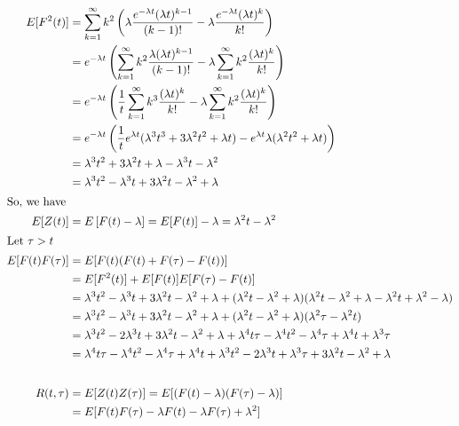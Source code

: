 \begin{enumerate}
\begin{align*}
      E[F^2(t)] & = \sum_{k=1}^{\infty} k^2 \left( \lambda \df{e^{-\lambda t} (\lambda t)^{k-1}}{(k-1)!}
                -\lambda \df{e^{-\lambda t} (\lambda t)^k}{k!} \right) \\
           & = e^{-\lambda t} \left( \sum_{k=1}^{\infty} k^2 \df{\lambda (\lambda t)^{k-1}}{(k-1)!}
             - \lambda \sum_{k=1}^{\infty} k^2\df{(\lambda t)^k}{k!}\right) \\
           & = e^{-\lambda t} \left( \df{1}{t}\sum_{k=1}^{\infty} k^3 \df{(\lambda t)^{k}}{k!}
             - \lambda \sum_{k=1}^{\infty} k^2 \df{(\lambda t)^k}{k!}\right) \\
           & = e^{-\lambda t} \left(  \df{1}{t} e^{\lambda t}(\lambda^3t^3 + 3\lambda^2t^2 + \lambda t)
             - e^{\lambda t}\lambda (\lambda^2 t^2 + \lambda t)\right) \\
           & = \lambda^3t^2 + 3 \lambda^2t + \lambda - \lambda^3t - \lambda^2 \\
           & = \lambda^3t^2 - \lambda^3t + 3 \lambda^2t - \lambda^2 + \lambda \\
      \shortintertext{So, we have}
      E[Z(t)] & = E\left[ F(t) - \lambda \right] = E[F(t)] - \lambda = \lambda^2 t - \lambda^2\\
      \shortintertext{Let $\tau > t$}
      E[F(t)F(\tau)] & = E[F(t)(F(t) + F(\tau) - F(t))] \\
           & = E[F^2(t)] + E[F(t)]E[F(\tau) - F(t)] \\
           & = \lambda^3t^2 - \lambda^3t + 3 \lambda^2t - \lambda^2 + \lambda
             + (\lambda^2 t - \lambda^2 + \lambda)
             (\lambda^2 t - \lambda^2 + \lambda - \lambda^2 t + \lambda^2 - \lambda) \\
           & = \lambda^3t^2 - \lambda^3 t + 3 \lambda^2t - \lambda^2 + \lambda
             + (\lambda^2 t - \lambda^2 + \lambda)(\lambda^2 \tau - \lambda^2 t) \\
           & = \lambda^3 t^2 - 2 \lambda^3 t + 3 \lambda^2 t - \lambda^2 + \lambda +
             \lambda^4 t \tau - \lambda^4 t^2 - \lambda^4 \tau + \lambda^4 t + \lambda^3 \tau\\
           & = \lambda^4 t \tau - \lambda^4 t^2 - \lambda^4 \tau + \lambda^4 t
             + \lambda^3 t^2 - 2 \lambda^3 t + \lambda^3 \tau + 3 \lambda^2 t - \lambda^2 + \lambda \\
      \shortintertext{}
      R(t, \tau) & = E[Z(t)Z(\tau)] = E[(F(t) - \lambda)(F(\tau) - \lambda)] \\
           & = E[F(t)F(\tau) - \lambda F(t) - \lambda F(\tau) + \lambda^2] \\

\end{align*}
\end{enumerate}
